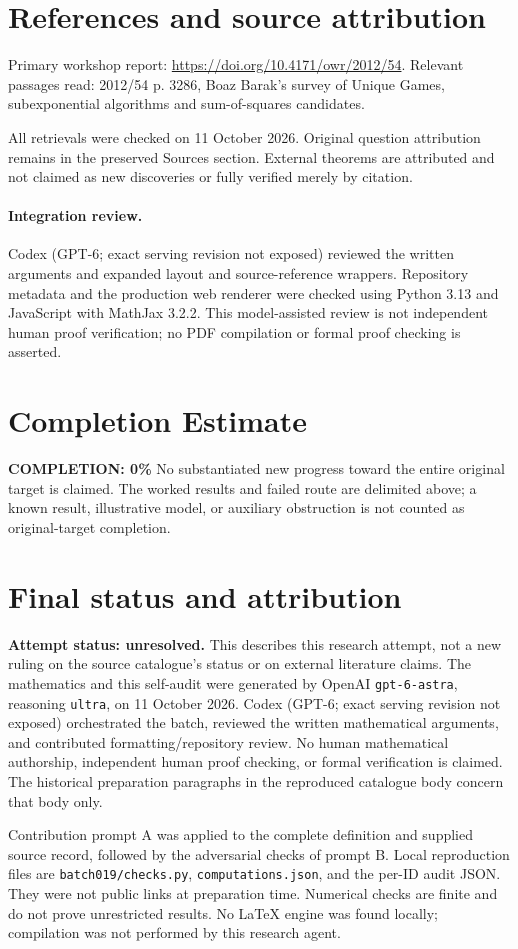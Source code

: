 \documentclass[11pt]{article}
\begin{document}
\section{References and source attribution}
Primary workshop report: \url{https://doi.org/10.4171/owr/2012/54}. Relevant passages read: 2012/54 p. 3286, Boaz Barak’s survey of Unique Games, subexponential algorithms and sum-of-squares candidates.

All retrievals were checked on 11 October 2026. Original question attribution remains in the preserved Sources section. External theorems are attributed and not claimed as new discoveries or fully verified merely by citation.


\paragraph{Integration review.} Codex (GPT-6; exact serving revision not exposed) reviewed the written arguments and expanded layout and source-reference wrappers. Repository metadata and the production web renderer were checked using Python 3.13 and JavaScript with MathJax 3.2.2. This model-assisted review is not independent human proof verification; no PDF compilation or formal proof checking is asserted.

\section{Completion Estimate}
\noindent\textbf{COMPLETION: 0\%}
No substantiated new progress toward the entire original target is claimed. The worked results and failed route are delimited above; a known result, illustrative model, or auxiliary obstruction is not counted as original-target completion.

\section{Final status and attribution}
\textbf{Attempt status: unresolved.} This describes this research attempt, not a new ruling on the source catalogue's status or on external literature claims.
The mathematics and this self-audit were generated by OpenAI \texttt{gpt-6-astra}, reasoning \texttt{ultra}, on 11 October 2026. Codex (GPT-6; exact serving revision not exposed) orchestrated the batch, reviewed the written mathematical arguments, and contributed formatting/repository review. No human mathematical authorship, independent human proof checking, or formal verification is claimed. The historical preparation paragraphs in the reproduced catalogue body concern that body only.

Contribution prompt A was applied to the complete definition and supplied source record, followed by the adversarial checks of prompt B. Local reproduction files are \texttt{batch019/checks.py}, \texttt{computations.json}, and the per-ID audit JSON. They were not public links at preparation time. Numerical checks are finite and do not prove unrestricted results. No LaTeX engine was found locally; compilation was not performed by this research agent.
\end{document}
